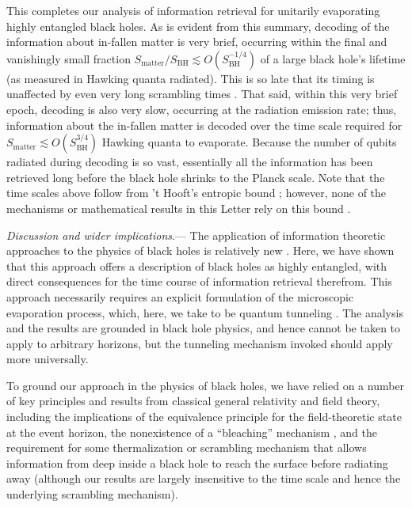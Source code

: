 \documentclass[aps,showpacs,prl,12pt]{revtex4}
\begin{document}
This completes our analysis of information retrieval for unitarily
evaporating highly entangled black holes.
As is evident from this
summary, decoding of the information about in-fallen matter is
very brief, occurring within the final and vanishingly small fraction
$S_{\text{matter}}/S_{\text{BH}}\lesssim O(S_{\text{BH}}^{-1/4})$
of a large black hole's lifetime (as measured in Hawking quanta
radiated). This is so late that its timing is unaffected by even
very long scrambling times \cite{Giddings07}. That said, within this
very brief epoch, decoding is also very slow, occurring at the
radiation emission rate; thus, information about the in-fallen
matter is decoded over the time scale required for
$S_{\text{matter}} \lesssim O(S_{\text{BH}}^{3/4})$ Hawking quanta
to evaporate. Because the number of qubits radiated during decoding
is so vast, essentially all the information has been retrieved long
before the black hole shrinks to the Planck scale.
Note that the time scales above follow from 't Hooft's
entropic bound \cite{tHooft93}; however, none of the mechanisms or
mathematical results in this Letter rely on this bound \cite{SM}.

{\it Discussion and wider implications}.---%
The application of information theoretic approaches to the physics of
black holes is relatively
new \cite{me,Nikolic,Page93,Hayden07,Smolin,B10,Susskind93}.
Here, we have shown that this approach offers a
description of black holes as highly entangled, with direct consequences
for the time course of information retrieval therefrom. 
This approach necessarily requires an explicit formulation of the 
microscopic evaporation process, which, here, we take to be quantum 
tunneling \cite{B10}. The analysis and the results are grounded
in black hole physics, and hence cannot be taken to apply to arbitrary
horizons, but the tunneling mechanism invoked should apply more universally. 

To ground our approach in the physics of black holes, we have relied
on a number of key principles and results from classical general
relativity and field theory, including the implications of the
equivalence principle \cite{Susskind93} for the field-theoretic state
at the event horizon, the nonexistence of a ``bleaching''
mechanism \cite{bleach}, and the requirement for some thermalization
or scrambling mechanism \cite{Hayden07,Sekino08,Giddings07} that
allows information from deep inside a black hole to reach the surface
before radiating away \cite{fnB} (although our results are largely
insensitive to the time scale and hence the underlying scrambling
mechanism).
\end{document}
